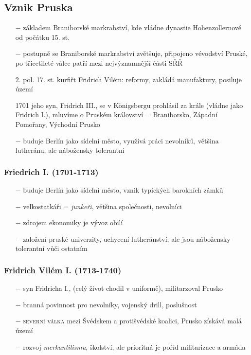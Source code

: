 \documentclass{article}
\begin{document}
\subsection*{Vznik Pruska}
\begin{itemize}
    \vspace{-0.5em}
    \setlength\itemsep{0.15em}
    \item[$-$] základem Braniborské markrabství, kde vládne dynastie Hohenzollernové od počátku 15. st.
    \item[$-$] postupně se Braniborské markrabství zvětšuje, připojeno vévodství Pruské, po třicetileté válce patří mezi nejvýznamnější části SŘŘ
    \item[2. pol. 17. st.] kurfiřt Fridrich Vilém: reformy, zakládá manufaktury, posiluje území
    \item[1701] jeho syn, Fridrich III., se v Königsbergu prohlásil za krále (vládne jako Fridrich I.), mluvíme o Pruském království = Braniborsko, Západní Pomořany, Východní Prusko
    \item[$-$] buduje Berlín jako sídelní město, využívá práci nevolníků, většina lutheránu, ale nábožensky tolerantní
\end{itemize}

\subsubsection*{Friedrich I. (1701-1713)}
\begin{itemize}
    \vspace{-0.5em}
    \setlength\itemsep{0.15em}
    \item[$-$] buduje Berlín jako sídelní město, vznik typických barokních zámků
    \item[$-$] velkostatkáři = \textit{junkeři}, většina společnosti, nevolníci
    \item[$-$] zdrojem ekonomiky je vývoz obilí
    \item[$-$] založení pruské univerzity, uchycení lutheránství, ale jsou nábožensky tolerantní vůči ostatním
\end{itemize}

\subsubsection*{Fridrich Vilém I. (1713-1740)}
\begin{itemize}
    \vspace{-0.5em}
    \setlength\itemsep{0.15em}
    \item[$-$] syn Fridricha I.,  (celý život chodil v uniformě), militarzoval Prusko
    \item[$-$] branná povinnost pro nevolníky, vojenský drill, poslušnost
    \item[$-$] \textsc{severní válka} mezi Švédskem a protišvédské koalici, Prusko získává malá území
    \item[$-$] rozvoj \textit{merkantilismu}, školství, ale prioritná je poříd militarizace a armáda
\end{itemize}
\end{document}
